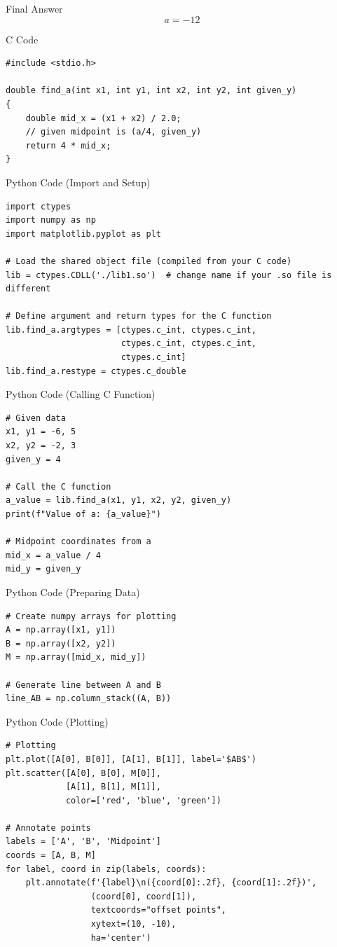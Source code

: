 \documentclass{beamer}
\begin{document}
\begin{frame}{Final Answer}
\[
\boxed{a = -12}
\]
\end{frame}
\begin{frame}[fragile]{C Code}
\begin{verbatim}
#include <stdio.h>

double find_a(int x1, int y1, int x2, int y2, int given_y)
{
    double mid_x = (x1 + x2) / 2.0;
    // given midpoint is (a/4, given_y)
    return 4 * mid_x;
}
\end{verbatim}
\end{frame}
\begin{frame}[fragile]{Python Code (Import and Setup)}
\begin{verbatim}
import ctypes
import numpy as np
import matplotlib.pyplot as plt

# Load the shared object file (compiled from your C code)
lib = ctypes.CDLL('./lib1.so')  # change name if your .so file is different

# Define argument and return types for the C function
lib.find_a.argtypes = [ctypes.c_int, ctypes.c_int, 
                       ctypes.c_int, ctypes.c_int, 
                       ctypes.c_int]
lib.find_a.restype = ctypes.c_double
\end{verbatim}
\end{frame}
\begin{frame}[fragile]{Python Code (Calling C Function)}
\begin{verbatim}
# Given data
x1, y1 = -6, 5
x2, y2 = -2, 3
given_y = 4

# Call the C function
a_value = lib.find_a(x1, y1, x2, y2, given_y)
print(f"Value of a: {a_value}")

# Midpoint coordinates from a
mid_x = a_value / 4
mid_y = given_y
\end{verbatim}
\end{frame}
\begin{frame}[fragile]{Python Code (Preparing Data)}
\begin{verbatim}
# Create numpy arrays for plotting
A = np.array([x1, y1])
B = np.array([x2, y2])
M = np.array([mid_x, mid_y])

# Generate line between A and B
line_AB = np.column_stack((A, B))
\end{verbatim}
\end{frame}
\begin{frame}[fragile]{Python Code (Plotting)}
\begin{verbatim}
# Plotting
plt.plot([A[0], B[0]], [A[1], B[1]], label='$AB$')
plt.scatter([A[0], B[0], M[0]], 
            [A[1], B[1], M[1]], 
            color=['red', 'blue', 'green'])

# Annotate points
labels = ['A', 'B', 'Midpoint']
coords = [A, B, M]
for label, coord in zip(labels, coords):
    plt.annotate(f'{label}\n({coord[0]:.2f}, {coord[1]:.2f})',
                 (coord[0], coord[1]),
                 textcoords="offset points",
                 xytext=(10, -10),
                 ha='center')
\end{verbatim}
\end{frame}
\end{document}
